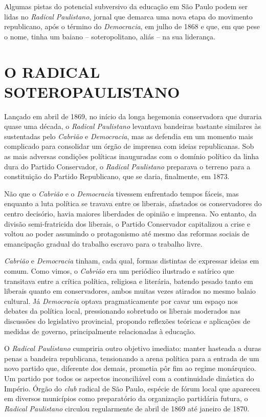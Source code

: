 Algumas pistas do potencial subversivo da educação em São Paulo podem
ser lidas no \emph{Radical Paulistano}, jornal que demarca uma nova
etapa do movimento republicano, após o término do \emph{Democracia}, em
julho de 1868 e que, em que pese o nome, tinha um baiano --
soteropolitano, aliás -- na sua liderança.

\section{O RADICAL SOTEROPAULISTANO}

Lançado em abril de 1869, no início da longa hegemonia conservadora que
duraria quase uma década, o \emph{Radical Paulistano} levantava
bandeiras bastante similares às sustentadas pelo \emph{Cabrião} e
\emph{Democracia}, mas as defendia em um momento mais complicado para
consolidar um órgão de imprensa com ideias republicanas. Sob as mais
adversas condições políticas inauguradas com o domínio político da linha
dura do Partido Conservador, o \emph{Radical Paulistano} preparava o
terreno para a constituição do Partido Republicano, que se daria,
finalmente, em 1873.

Não que o \emph{Cabrião} e o \emph{Democracia} tivessem enfrentado
tempos fáceis, mas enquanto a luta política se travava entre os
liberais, afastados os conservadores do centro decisório, havia maiores
liberdades de opinião e imprensa. No entanto, da divisão semi-fratricida
dos liberais, o Partido Conservador capitalizou a crise e voltou ao
poder assumindo o protagonismo até mesmo das reformas sociais de
emancipação gradual do trabalho escravo para o trabalho livre.

\emph{Cabrião} e \emph{Democracia} tinham, cada qual, formas distintas
de expressar ideias em comum. Como vimos, o \emph{Cabrião} era um
periódico ilustrado e satírico que transitava entre a crítica política,
religiosa e literária, batendo pesado tanto em liberais quanto em
conservadores, ambos muitas vezes atirados no mesmo balaio cultural. Já
\emph{Democracia} optava pragmaticamente por cavar um espaço nos debates
da política local, pressionando sobretudo os liberais moderados nas
discussões do legislativo provincial, propondo reflexões teóricas e
aplicações de medidas de governo, principalmente relacionadas à
educação.

O \emph{Radical Paulistano} cumpriria outro objetivo imediato: manter
hasteada a duras penas a bandeira republicana, tensionando a arena
política para a entrada de um novo partido que, diferente dos demais,
prometia pôr fim ao regime monárquico. Um partido por todos os aspectos
inconciliável com a continuidade dinástica do Império. Órgão do
\emph{club} radical de São Paulo, espécie de fórum local que apareceu em
diversos municípios como preparatório da organização partidária futura,
o \emph{Radical Paulistano} circulou regularmente de abril de 1869 até
janeiro de 1870.

